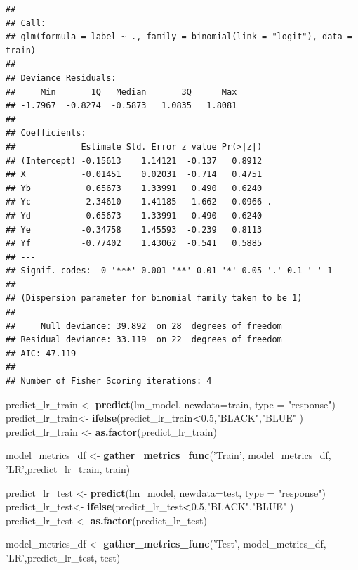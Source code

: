 \documentclass[
]{article}
\newenvironment{Shaded}{\begin{snugshade}}{\end{snugshade}}
\newcommand{\DataTypeTok}[1]{\textcolor[rgb]{0.13,0.29,0.53}{#1}}
\newcommand{\FloatTok}[1]{\textcolor[rgb]{0.00,0.00,0.81}{#1}}
\newcommand{\KeywordTok}[1]{\textcolor[rgb]{0.13,0.29,0.53}{\textbf{#1}}}
\newcommand{\NormalTok}[1]{#1}
\newcommand{\OperatorTok}[1]{\textcolor[rgb]{0.81,0.36,0.00}{\textbf{#1}}}
\newcommand{\StringTok}[1]{\textcolor[rgb]{0.31,0.60,0.02}{#1}}
\begin{document}
\begin{verbatim}
## 
## Call:
## glm(formula = label ~ ., family = binomial(link = "logit"), data = train)
## 
## Deviance Residuals: 
##     Min       1Q   Median       3Q      Max  
## -1.7967  -0.8274  -0.5873   1.0835   1.8081  
## 
## Coefficients:
##             Estimate Std. Error z value Pr(>|z|)  
## (Intercept) -0.15613    1.14121  -0.137   0.8912  
## X           -0.01451    0.02031  -0.714   0.4751  
## Yb           0.65673    1.33991   0.490   0.6240  
## Yc           2.34610    1.41185   1.662   0.0966 .
## Yd           0.65673    1.33991   0.490   0.6240  
## Ye          -0.34758    1.45593  -0.239   0.8113  
## Yf          -0.77402    1.43062  -0.541   0.5885  
## ---
## Signif. codes:  0 '***' 0.001 '**' 0.01 '*' 0.05 '.' 0.1 ' ' 1
## 
## (Dispersion parameter for binomial family taken to be 1)
## 
##     Null deviance: 39.892  on 28  degrees of freedom
## Residual deviance: 33.119  on 22  degrees of freedom
## AIC: 47.119
## 
## Number of Fisher Scoring iterations: 4
\end{verbatim}

\begin{Shaded}
\begin{Highlighting}[]
\NormalTok{predict_lr_train <-}\StringTok{ }\KeywordTok{predict}\NormalTok{(lm_model, }\DataTypeTok{newdata=}\NormalTok{train, }\DataTypeTok{type =} \StringTok{"response"}\NormalTok{)}
\NormalTok{predict_lr_train<-}\StringTok{ }\KeywordTok{ifelse}\NormalTok{(predict_lr_train}\OperatorTok{<}\FloatTok{0.5}\NormalTok{,}\StringTok{"BLACK"}\NormalTok{,}\StringTok{"BLUE"}\NormalTok{ )}
\NormalTok{predict_lr_train <-}\StringTok{ }\KeywordTok{as.factor}\NormalTok{(predict_lr_train)}

\NormalTok{model_metrics_df <-}\StringTok{ }\KeywordTok{gather_metrics_func}\NormalTok{(}\StringTok{'Train'}\NormalTok{, model_metrics_df, }\StringTok{'LR'}\NormalTok{,predict_lr_train, train)}

\NormalTok{predict_lr_test <-}\StringTok{ }\KeywordTok{predict}\NormalTok{(lm_model, }\DataTypeTok{newdata=}\NormalTok{test, }\DataTypeTok{type =} \StringTok{"response"}\NormalTok{)}
\NormalTok{predict_lr_test<-}\StringTok{ }\KeywordTok{ifelse}\NormalTok{(predict_lr_test}\OperatorTok{<}\FloatTok{0.5}\NormalTok{,}\StringTok{"BLACK"}\NormalTok{,}\StringTok{"BLUE"}\NormalTok{ )}
\NormalTok{predict_lr_test <-}\StringTok{ }\KeywordTok{as.factor}\NormalTok{(predict_lr_test)}

\NormalTok{model_metrics_df <-}\StringTok{ }\KeywordTok{gather_metrics_func}\NormalTok{(}\StringTok{'Test'}\NormalTok{, model_metrics_df, }\StringTok{'LR'}\NormalTok{,predict_lr_test, test)}
\end{Highlighting}
\end{Shaded}
\end{document}
